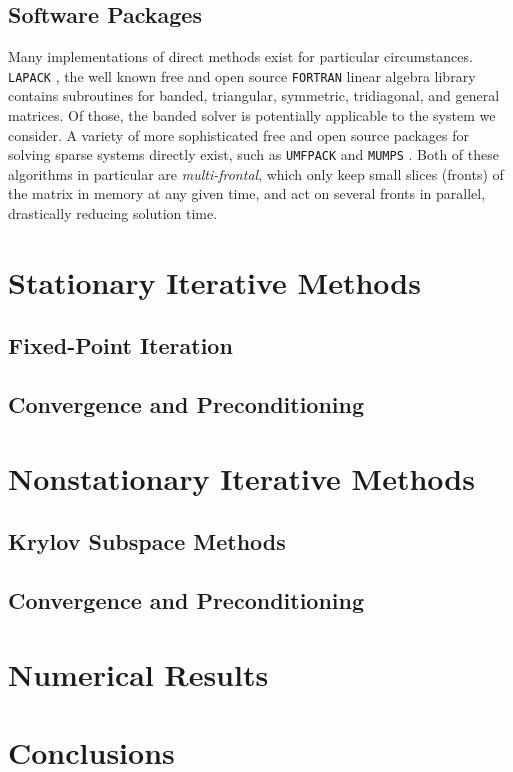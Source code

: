 \documentclass[10pt]{article}
\begin{document}
\begin{multicols}{2}
\subsection{Software Packages}
Many implementations of direct methods exist for particular circumstances.
\texttt{LAPACK} \citep{anderson_lapack_1999}, the well known free and open source \texttt{FORTRAN} linear algebra library  contains subroutines for banded, triangular, symmetric, tridiagonal, and general matrices.
Of those, the banded solver is potentially applicable to the system we consider.
A variety of more sophisticated free and open source packages for solving sparse systems directly exist, such as \texttt{UMFPACK} \citep{davis_algorithm_2004} and \texttt{MUMPS} \citep{amestoy_mumps:_2001}.
Both of these algorithms in particular are \textit{multi-frontal}, which only keep small slices (fronts) of the matrix in memory at any given time, and act on several fronts in parallel, drastically reducing solution time.

\section{Stationary Iterative Methods}
\subsection{Fixed-Point Iteration}
\subsection{Convergence and Preconditioning}

\section{Nonstationary Iterative Methods}
\subsection{Krylov Subspace Methods}
\subsection{Convergence and Preconditioning}

\section{Numerical Results}

\section{Conclusions}

\nocite{*}


\end{multicols}
\end{document}
